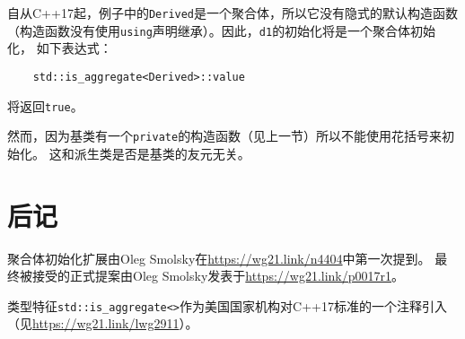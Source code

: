 自从C++17起，例子中的\texttt{Derived}是一个聚合体，所以它没有隐式的默认构造函数
（构造函数没有使用\texttt{using}声明继承）。因此，\texttt{d1}的初始化将是一个聚合体初始化，
如下表达式：
\begin{lstlisting}
    std::is_aggregate<Derived>::value
\end{lstlisting}
将返回\texttt{true}。

然而，因为基类有一个\texttt{private}的构造函数（见上一节）所以不能使用花括号来初始化。
这和派生类是否是基类的友元无关。

\section{后记}
聚合体初始化扩展由Oleg Smolsky在\url{https://wg21.link/n4404}中第一次提到。
最终被接受的正式提案由Oleg Smolsky发表于\url{https://wg21.link/p0017r1}。

类型特征\texttt{std::is\_aggregate<>}作为美国国家机构对C++17标准的一个注释引入
（见\url{https://wg21.link/lwg2911}）。